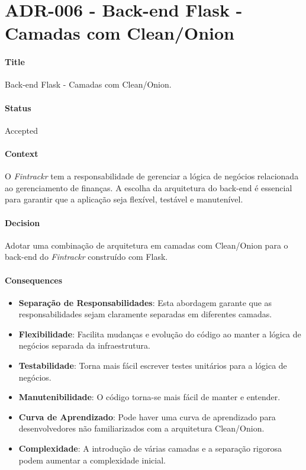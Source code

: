 
\chapter{ADR-006 - Back-end Flask - Camadas com Clean/Onion}
\label{apendiceADR006}

\subsubsection*{Title}
Back-end Flask - Camadas com Clean/Onion.

\subsubsection*{Status}
Accepted

\subsubsection*{Context}
O \textit{Fintrackr} tem a responsabilidade de gerenciar a lógica de negócios relacionada ao gerenciamento de finanças. A escolha da arquitetura do back-end é essencial para garantir que a aplicação seja flexível, testável e manutenível.

\subsubsection*{Decision}
Adotar uma combinação de arquitetura em camadas com Clean/Onion para o back-end do \textit{Fintrackr} construído com Flask.

\subsubsection*{Consequences}
\begin{itemize}
	\item \textbf{Separação de Responsabilidades}: Esta abordagem garante que as responsabilidades sejam claramente separadas em diferentes camadas.
	\item \textbf{Flexibilidade}: Facilita mudanças e evolução do código ao manter a lógica de negócios separada da infraestrutura.
	\item \textbf{Testabilidade}: Torna mais fácil escrever testes unitários para a lógica de negócios.
	\item \textbf{Manutenibilidade}: O código torna-se mais fácil de manter e entender.
	\item \textbf{Curva de Aprendizado}: Pode haver uma curva de aprendizado para desenvolvedores não familiarizados com a arquitetura Clean/Onion.
	\item \textbf{Complexidade}: A introdução de várias camadas e a separação rigorosa podem aumentar a complexidade inicial.
\end{itemize}

\newpage
